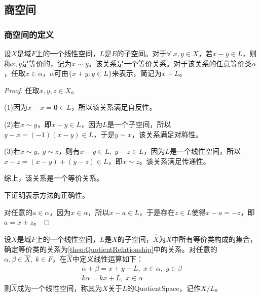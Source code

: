 \subsection{商空间}
\subsubsection{商空间的定义}
\begin{theorem}\label{theo:QuotientRelationship}
	设$X$是域$F$上的一个线性空间，$L$是$E$的子空间。对于$\forall\;x,y\in X$，若$x-y\in L$，则称$x,y$是等价的，记为$x\sim y$。该关系是一个等价关系。对于该关系的任意等价类$\alpha$，任取$x\in\alpha$，$\alpha$可由$\{x+y:y\in L\}$来表示，简记为$x+L$。
\end{theorem}
\begin{proof}
	任取$x,y,z\in X$。\par
	(1)因为$x-x=\mathbf{0}\in L$，所以该关系满足自反性。\par
	(2)若$x\sim y$，即$x-y\in L$，因为$L$是一个子空间，所以$y-x=(-1)(x-y)\in L$，于是$y\sim x$，该关系满足对称性。\par
	(3)若$x\sim y,\;y\sim z$，则有$x-y\in L,\;y-z\in L$，因为$L$是一个线性空间，所以$x-z=(x-y)+(y-z)\in L$，即$x\sim z$。该关系满足传递性。\par
	综上，该关系是一个等价关系。\par
	下证明表示方法的正确性。\par
	对任意的$a\in\alpha$，因为$x\in\alpha$，所以$x-a\in L$，于是存在$z\in L$使得$x-a=-z$，即$a=x+z$。
\end{proof}
\begin{theorem}
	设$X$是域$F$上的一个线性空间，$L$是$X$的子空间，$\hat{X}$为$X$中所有等价类构成的集合，确定等价类的关系为\cref{theo:QuotientRelationship}中的关系。对任意的$\alpha,\beta\in\hat{X},\;k\in F$，在$\hat{X}$中定义线性运算如下：
	\begin{gather*}
		\alpha+\beta=x+y+L,\;x\in\alpha,\;y\in\beta \\
		k\alpha=kx+L,\;x\in\alpha
	\end{gather*}
	则$\hat{X}$成为一个线性空间，称其为$X$关于$L$的\gls{QuotientSpace}，记作$X/L$。
\end{theorem}
